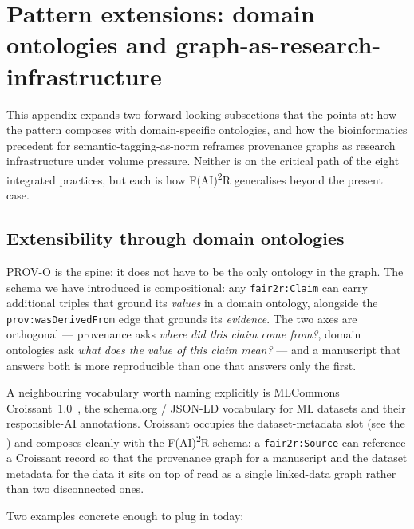 \section{Pattern extensions: domain ontologies and graph-as-research-infrastructure}
\label{sec:appendix-pattern-extensions}

This appendix expands two forward-looking subsections that the
 points at: how the pattern composes
with domain-specific ontologies, and how the bioinformatics
precedent for semantic-tagging-as-norm reframes provenance graphs
as research infrastructure under volume pressure. Neither is on
the critical path of the eight integrated practices, but each is
how F(AI)\textsuperscript{2}R generalises beyond the present case.

\subsection{Extensibility through domain ontologies}
\label{sec:domain-ontologies}

PROV-O is the spine; it does not have to be the only ontology in
the graph. The schema we have introduced is compositional: any
\texttt{fair2r:Claim} can carry additional triples that ground its
\emph{values} in a domain ontology, alongside the
\texttt{prov:wasDerivedFrom} edge that grounds its
\emph{evidence}. The two axes are orthogonal --- provenance asks
\emph{where did this claim come from?}, domain ontologies ask
\emph{what does the value of this claim mean?} --- and a manuscript
that answers both is more reproducible than one that answers only
the first.

A neighbouring vocabulary worth naming explicitly is MLCommons
Croissant~1.0~\cite{benjelloun2024croissant}, the schema.org /
JSON-LD vocabulary for ML datasets and their responsible-AI
annotations. Croissant occupies the dataset-metadata slot
(see the ) and composes cleanly with the
F(AI)\textsuperscript{2}R schema: a \texttt{fair2r:Source} can
reference a Croissant record so that the provenance graph for a
manuscript and the dataset metadata for the data it sits on top of
read as a single linked-data graph rather than two disconnected
ones.

Two examples concrete enough to plug in today:

